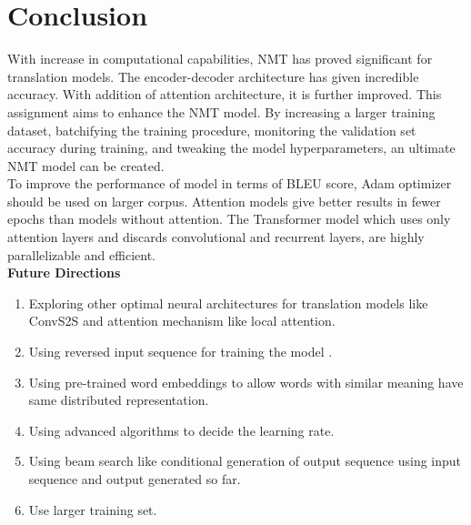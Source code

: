 \documentclass[11pt, oneside]{article}   	%
\begin{document}
\section{Conclusion} 
With increase in computational capabilities, NMT has proved significant for translation models. The encoder-decoder architecture has given incredible accuracy. With addition of attention architecture, it is further improved. This assignment aims to enhance the NMT model. By increasing a larger training dataset, batchifying the training procedure, monitoring the validation set accuracy during training, and tweaking the model hyperparameters, an ultimate NMT model can be created.\\
To improve the performance of model in terms of BLEU score, Adam optimizer should be used on larger corpus. Attention models give better results in fewer epochs than models without attention. The Transformer model which uses only attention layers and discards convolutional and recurrent layers, are highly parallelizable and efficient.\\

\textbf{Future Directions}
\begin{enumerate}
\item Exploring other optimal neural architectures for translation models like ConvS2S and attention mechanism like local attention.
\item Using reversed input sequence for training the model \cite{luong-etal-2015-effective}.
\item Using pre-trained word embeddings to allow words with similar meaning have same distributed representation.
\item Using advanced algorithms to decide the learning rate.
\item Using beam search like conditional generation of output sequence using input sequence and output generated so far.
\item Use larger training set.
\end{enumerate}
 

\end{document}
